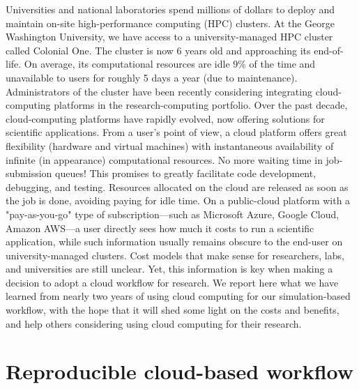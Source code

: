 \documentclass[10pt,journal,compsoc]{IEEEtran}
\begin{document}
Universities and national laboratories spend millions of dollars to deploy and maintain on-site high-performance computing (HPC) clusters.
At the George Washington University, we have access to a university-managed HPC cluster called Colonial One.
The cluster is now $6$ years old and approaching its end-of-life.
On average, its computational resources are idle $9\%$ of the time and unavailable to users for roughly 5 days a year (due to maintenance).
Administrators of the cluster have been recently considering integrating cloud-computing platforms in the research-computing portfolio. 
Over the past decade, cloud-computing platforms have rapidly evolved, now offering solutions for scientific applications.
From a user's point of view, a cloud platform offers great flexibility (hardware and virtual machines) with instantaneous availability of infinite (in appearance) computational resources.
No more waiting time in job-submission queues!
This promises to greatly facilitate code development, debugging, and testing. Resources allocated on the cloud are released as soon as the job is done, avoiding paying for idle time.
On a public-cloud platform with a "pay-as-you-go" type of subscription---such as Microsoft Azure, Google Cloud, Amazon AWS---a user directly sees how much it costs to run a scientific application, while such information usually remains obscure to the end-user on university-managed clusters. 
Cost models that make sense for researchers, labs, and universities are still unclear. 
Yet, this information is key when making a decision to adopt a cloud workflow for research. 
We report here what we have learned from nearly two years of using cloud computing for our simulation-based workflow, with the hope that it will shed some light on the costs and benefits, and help others considering using cloud computing for their research.

\section{Reproducible cloud-based workflow}\label{sec:workflow}
\end{document}
